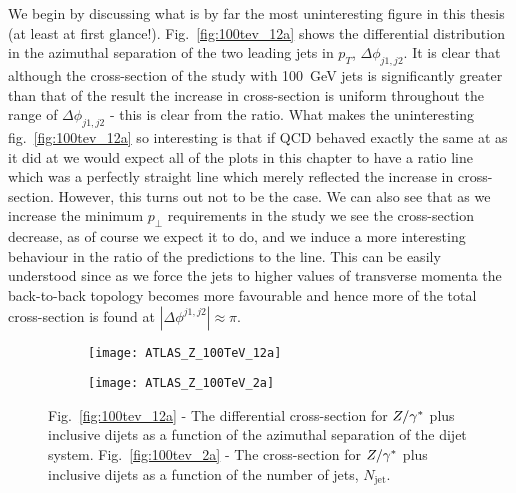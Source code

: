 	We begin by discussing what is by far the most uninteresting figure in this thesis (at least at first glance!).
	Fig.~\eqref{fig:100tev_12a} shows the differential distribution in the azimuthal separation of the
	two leading jets in $p_T$, $\Delta\phi_{j1, j2}$.  It is clear that although the cross-section of the \htev
	study with 100~GeV jets is significantly greater than that of the \stev result the increase in cross-section is uniform
	throughout the range of $\Delta\phi_{j1, j2}$ - this is clear from the ratio.  What makes the uninteresting
	fig.~\eqref{fig:100tev_12a} so interesting is that if QCD behaved exactly the same at \htev as it did at \stev
	we would expect all of the plots in this chapter to have a ratio line which was a perfectly straight line
	which merely reflected the increase in cross-section.  However, this turns out not to be the case.  We can also see
	that as we increase the minimum $p_\perp$ requirements in the \htev study we see the cross-section decrease, as of course
	we expect it to do, and we induce a more interesting behaviour in the ratio of the predictions to the \stev line.
	This can be easily understood since as we force the jets to higher values of transverse momenta the back-to-back
	topology becomes more favourable and hence more of the total cross-section is found at $|\Delta\phi^{j1, j2}|\approx\pi$.

	\begin{figure}[bth]
		\centering
		\begin{subfigure}[b]{0.49\textwidth}
			\texttt{[image: ATLAS\_Z\_100TeV\_12a]}
			\caption{}
			\label{fig:100tev_12a}
		\end{subfigure}
		\begin{subfigure}[b]{0.49\textwidth}
			\texttt{[image: ATLAS\_Z\_100TeV\_2a]}
			\caption{}
			\label{fig:100tev_2a}
		\end{subfigure}
		\caption{Fig.~\eqref{fig:100tev_12a} - The differential cross-section for $Z/\gamma^*$ plus inclusive dijets as a
		function of the azimuthal separation of the dijet system. Fig.~\eqref{fig:100tev_2a} - The cross-section
		for $Z/\gamma^*$ plus inclusive dijets as a function of the number of jets, $N_{\text{jet}}$.}
	\end{figure}

